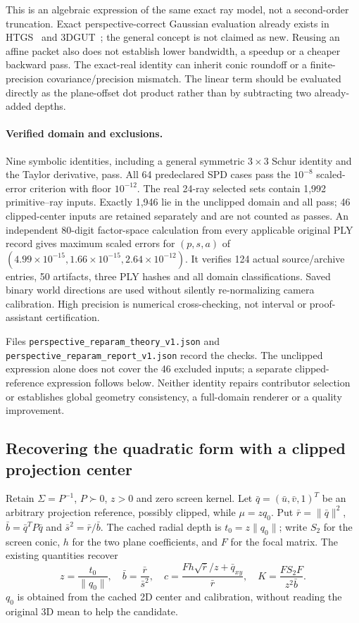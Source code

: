 \documentclass[11pt,a4paper]{article}
\begin{document}
This is an algebraic expression of the same exact ray model, not a
second-order truncation. Exact perspective-correct Gaussian evaluation
already exists in HTGS~\cite{htgs} and 3DGUT~\cite{threedgut}; the
general concept is not claimed as new. Reusing an affine packet also
does not establish lower bandwidth, a speedup or a cheaper backward pass.
The exact-real identity can inherit conic roundoff or a finite-precision
covariance/precision mismatch. The linear term should be evaluated
directly as the plane-offset dot product rather than by subtracting
two already-added depths.

\paragraph{Verified domain and exclusions.}
Nine symbolic identities, including a general symmetric $3\times3$
Schur identity and the Taylor derivative, pass. All 64 predeclared
SPD cases pass the $10^{-8}$ scaled-error criterion with floor
$10^{-12}$. The real 24-ray selected sets contain 1,992 primitive--ray
inputs. Exactly 1,946 lie in the unclipped domain and all pass;
46 clipped-center inputs are retained separately and are not counted
as passes. An independent 80-digit factor-space calculation from every
applicable original PLY record gives maximum scaled errors for
$(p,s,a)$ of $(4.99\times10^{-15},1.66\times10^{-15},
2.64\times10^{-12})$. It verifies 124 actual source/archive entries,
50 artifacts, three PLY hashes and all domain classifications.
Saved binary world directions are used without silently re-normalizing
camera calibration. High precision is numerical cross-checking, not
interval or proof-assistant certification.

Files \texttt{perspective\_reparam\_theory\_v1.json} and
\texttt{perspective\_reparam\_report\_v1.json} record the checks.
The unclipped expression alone does not cover the 46 excluded inputs;
a separate clipped-reference expression follows below. Neither identity
repairs contributor selection or establishes global geometry consistency,
a full-domain renderer or a quality improvement.

\subsection{Recovering the quadratic form with a clipped projection center}

Retain $\Sigma=P^{-1}$, $P\succ0$, $z>0$ and zero screen kernel.
Let $\bar q=(\bar u,\bar v,1)^T$ be an arbitrary projection reference,
possibly clipped, while $\mu=zq_0$. Put $\bar r=\|\bar q\|^2$,
$\bar b=\bar q^TP\bar q$ and $\bar s^2=\bar r/\bar b$.
The cached radial depth is $t_0=z\|q_0\|$; write $S_2$ for the screen
conic, $h$ for the two plane coefficients, and $F$ for the focal matrix.
The existing quantities recover
\begin{equation}\label{eq:clipped-schur-recovery}
 z=\frac{t_0}{\|q_0\|},\quad \bar b=\frac{\bar r}{\bar s^2},\quad
 c=\frac{Fh\sqrt{\bar r}/z+\bar q_{xy}}{\bar r},\quad
 K=\frac{FS_2F}{z^2\bar b}.
\end{equation}
$q_0$ is obtained from the cached 2D center and calibration, without
reading the original 3D mean to help the candidate.
\end{document}
